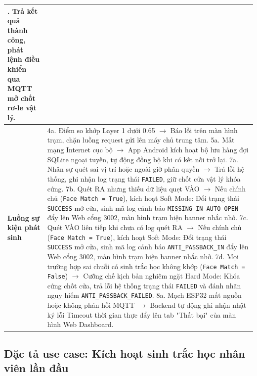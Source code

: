 ﻿\documentclass[../DoAn.tex]{subfiles}
\begin{document}
\begin{table}[ht!]
\begin{tabularx}{\linewidth}{|>{\raggedright\arraybackslash}p{2.8cm}|>{\raggedright\arraybackslash}X|}
8. Trả kết quả thành công, phát lệnh điều khiển qua MQTT mở chốt rơ-le vật lý. \\ \hline
\textbf{Luồng sự kiện phát sinh} & 
4a. Điểm so khớp Layer 1 dưới 0.65 $\rightarrow$ Báo lỗi trên màn hình trạm, chặn luồng request gửi lên máy chủ trung tâm. \newline
5a. Mất mạng Internet cục bộ $\rightarrow$ App Android kích hoạt bộ lưu hàng đợi SQLite ngoại tuyến, tự động đồng bộ khi có kết nối trở lại. \newline
7a. Nhân sự quét sai vị trí hoặc ngoài giờ phân quyền $\rightarrow$ Trả lỗi hệ thống, ghi nhận log trạng thái \texttt{FAILED}, giữ chốt cửa vật lý khóa cứng. \newline
7b. Quét RA nhưng thiếu dữ liệu quẹt VÀO $\rightarrow$ Nếu chính chủ (\texttt{Face Match = True}), kích hoạt Soft Mode: Đổi trạng thái \texttt{SUCCESS} mở cửa, sinh mã log cảnh báo \texttt{MISSING\_IN\_AUTO\_OPEN} đẩy lên Web cổng 3002, màn hình trạm hiện banner nhắc nhở. \newline
7c. Quét VÀO liên tiếp khi chưa có log quét RA $\rightarrow$ Nếu chính chủ (\texttt{Face Match = True}), kích hoạt Soft Mode: Đổi trạng thái \texttt{SUCCESS} mở cửa, sinh mã log cảnh báo \texttt{ANTI\_PASSBACK\_IN} đẩy lên Web cổng 3002, màn hình trạm hiện banner nhắc nhở. \newline
7d. Mọi trường hợp sai chuỗi có sinh trắc học không khớp (\texttt{Face Match = False}) $\rightarrow$ Cưỡng chế kịch bản nghiêm ngặt Hard Mode: Khóa cứng chốt cửa, trả lỗi hệ thống trạng thái \texttt{FAILED} và đánh nhãn nguy hiểm \texttt{ANTI\_PASSBACK\_FAILED}. \newline
8a. Mạch ESP32 mất nguồn hoặc không phản hồi MQTT $\rightarrow$ Backend tự động ghi nhận nhật ký lỗi Timeout thời gian thực đẩy lên tab "Thất bại" của màn hình Web Dashboard. \\ \hline
\end{tabularx}
\end{table}

\subsection{Đặc tả use case: Kích hoạt sinh trắc học nhân viên lần đầu}
\label{subsection:2.3.2}
\end{document}
